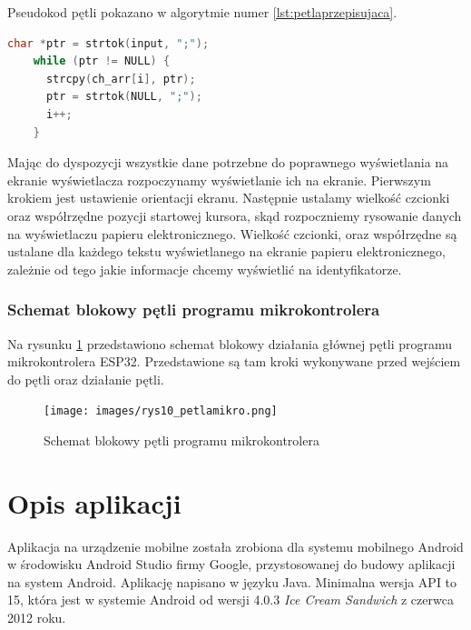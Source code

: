 \documentclass[a4paper,12pt, twoside]{article}
\begin{document}
    	Pseudokod pętli pokazano w algorytmie numer \ref{lst:petlaprzepisujaca}.
    
    \begin{lstlisting}[language=C++, label={lst:petlaprzepisujaca}, caption=Działanie pętli przepisującej otrzymane dane do tablicy]
    char *ptr = strtok(input, ";");
    while (ptr != NULL) {
      strcpy(ch_arr[i], ptr);
      ptr = strtok(NULL, ";");
      i++;
    }\end{lstlisting}	
    	\vspace{.5cm}
    	Mając do dyspozycji wszystkie dane potrzebne do poprawnego wyświetlania na ekranie wyświetlacza rozpoczynamy wyświetlanie ich na ekranie. Pierwszym krokiem jest ustawienie orientacji ekranu. Następnie ustalamy wielkość czcionki oraz współrzędne pozycji startowej kursora, skąd rozpoczniemy rysowanie danych na wyświetlaczu papieru elektronicznego. Wielkość czcionki, oraz współrzędne są ustalane dla każdego tekstu wyświetlanego na ekranie papieru elektronicznego, zależnie od tego jakie informacje chcemy wyświetlić na identyfikatorze.
    \vspace{1cm}
    	\subsubsection{Schemat blokowy pętli programu mikrokontrolera}
    	Na rysunku \ref{fig:petlamikrokontrolera} przedstawiono schemat blokowy działania głównej pętli programu mikrokontrolera ESP32. Przedstawione są tam kroki wykonywane przed wejściem do pętli oraz działanie pętli.
    	
    	\newpage
    	\begin{figure}[H]
    	        \centering
    			\texttt{[image: images/rys10\_petlamikro.png]}
    			\caption{Schemat blokowy pętli programu mikrokontrolera}
                \label{fig:petlamikrokontrolera}
    	\end{figure}
    	
    	\newpage
    	\section{Opis aplikacji}
    	\vspace{.5cm}
    	Aplikacja na urządzenie mobilne została zrobiona dla systemu mobilnego Android w środowisku Android Studio firmy Google, przystosowanej do budowy aplikacji na system Android. Aplikację napisano w języku Java. Minimalna wersja API to 15, która jest w systemie Android od wersji 4.0.3 \textit{Ice Cream Sandwich} z czerwca 2012 roku.
    	
\end{document}
